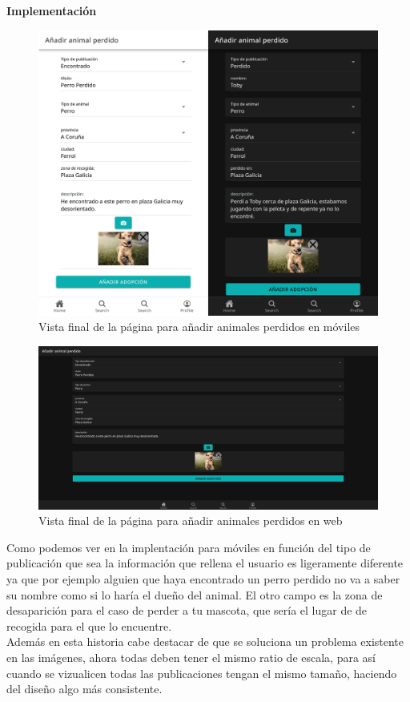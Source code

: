 \textbf{Implementación}

\begin{figure}[H]
	\centering
	\includegraphics[width=0.8\linewidth]{"sprint 2/hu4/impPerdidos"}
	\caption{Vista final de la página para añadir animales perdidos en móviles}
	\label{fig:impperdidos}
\end{figure}

\begin{figure}[H]
	\centering
	\includegraphics[width=0.8\linewidth]{"sprint 2/hu4/impPerdidosWeb"}
	\caption{Vista final de la página para añadir animales perdidos en web}
	\label{fig:impperdidosweb}
\end{figure}

Como podemos ver en la implentación para móviles en función del tipo de publicación que sea la información que rellena el usuario es ligeramente diferente ya que por ejemplo alguien que haya encontrado un perro perdido no va a saber su nombre como si lo haría el dueño del animal. El otro campo es la zona de desaparición  para el caso de perder a tu mascota, que sería el lugar de de recogida para el que lo encuentre. \\

Además en esta historia cabe destacar de que se soluciona un problema existente en las imágenes, ahora todas deben tener el mismo ratio de escala, para así cuando se vizualicen todas las publicaciones tengan el mismo tamaño, haciendo del diseño algo más consistente.\\

